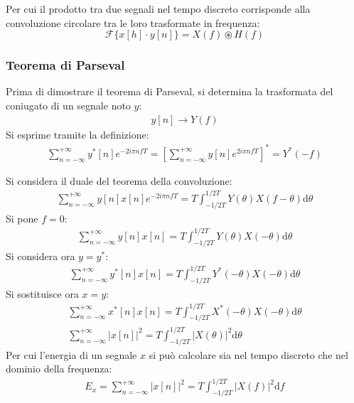 \documentclass{article}
\newcommand{\df}{\mathrm{d}}
\numberwithin{equation}{subsection}
\begin{document}
Per cui il prodotto tra due segnali nel tempo discreto corrisponde alla convoluzione circolare tra le loro trasformate in frequenza:
\begin{equation}
    \mathscr{F}\{x[h]\cdot y[n]\}=X(f)\circledast H(f)
\end{equation}

\subsubsection{Teorema di Parseval}

Prima di dimostrare il teorema di Parseval, si determina la trasformata del coniugato di un segnale noto $y$:
\begin{gather*}
    y[n]\to Y(f)
\end{gather*}
Si esprime tramite la definizione:
\begin{gather*}
    \displaystyle\sum_{n=-\infty}^{+\infty}y^*[n]e^{-2i\pi nfT}=\left[\sum_{n=-\infty}^{+\infty}y[n]e^{2i\pi nfT}\right]^*=Y^*(-f)
\end{gather*}

Si considera il duale del teorema della convoluzione:
\begin{gather*}
    \displaystyle\sum_{n=-\infty}^{+\infty}y[n]x[n]e^{-2i\pi nfT}=T\displaystyle\int_{-1/2T}^{1/2T}Y(\theta)X(f-\theta)\df\theta
\end{gather*}
Si pone $f=0$:
\begin{gather*}
    \displaystyle\sum_{n=-\infty}^{+\infty}y[n]x[n]=T\displaystyle\int_{-1/2T}^{1/2T}Y(\theta)X(-\theta)\df\theta
\end{gather*}
Si considera ora $y=y^*$:
\begin{gather*}
    \displaystyle\sum_{n=-\infty}^{+\infty}y^*[n]x[n]=T\displaystyle\int_{-1/2T}^{1/2T}Y^*(-\theta)X(-\theta)\df\theta
\end{gather*}
Si sostituisce ora $x=y$:
\begin{gather*}
    \displaystyle\sum_{n=-\infty}^{+\infty}x^*[n]x[n]=T\displaystyle\int_{-1/2T}^{1/2T}X^*(-\theta)X(-\theta)\df\theta\\
    \displaystyle\sum_{n=-\infty}^{+\infty}|x[n]|^2=T\int_{-1/2T}^{1/2T}|X(\theta)|^2\df\theta
\end{gather*}
Per cui l'energia di un segnale $x$ si può calcolare sia nel tempo discreto che nel dominio della frequenza:
\begin{gather}
    E_x=\displaystyle\sum_{n=-\infty}^{+\infty}|x[n]|^2=T\int_{-1/2T}^{1/2T}|X(f)|^2\df f
\end{gather}
\end{document}
